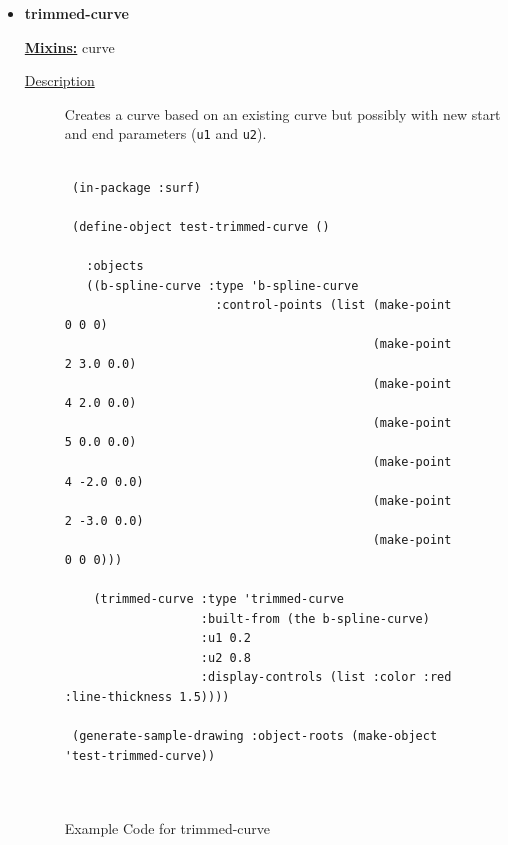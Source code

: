 \documentclass [11pt]{book}
\begin{document}
\begin{itemize}
\item {}
\label{prim:trimmed-curve}
\textbf{trimmed-curve}


\textbf{
\underline{Mixins:}} curve





\begin{description}

\item [
\underline{Description}]


Creates a curve based on an existing curve but possibly with new start and end parameters (\texttt{u1} and \texttt{u2}).



\end{description}




\begin{figure}
\begin{lrbox}{\boxedverb}
\begin{minipage}{\linewidth}
{\small

\begin{verbatim}
  
 (in-package :surf)

 (define-object test-trimmed-curve ()

   :objects
   ((b-spline-curve :type 'b-spline-curve
                     :control-points (list (make-point 0 0 0)
                                           (make-point 2 3.0 0.0) 
                                           (make-point 4 2.0 0.0) 
                                           (make-point 5 0.0 0.0) 
                                           (make-point 4 -2.0 0.0) 
                                           (make-point 2 -3.0 0.0) 
                                           (make-point 0 0 0)))
    
    (trimmed-curve :type 'trimmed-curve
                   :built-from (the b-spline-curve)
                   :u1 0.2
                   :u2 0.8
                   :display-controls (list :color :red :line-thickness 1.5))))

 (generate-sample-drawing :object-roots (make-object 'test-trimmed-curve))

   
\end{verbatim}}
\end{minipage}
\end{lrbox}
\fbox{\usebox{\boxedverb}}

\caption{Example Code for trimmed-curve}


\end{figure}
\end{itemize}
\end{document}
